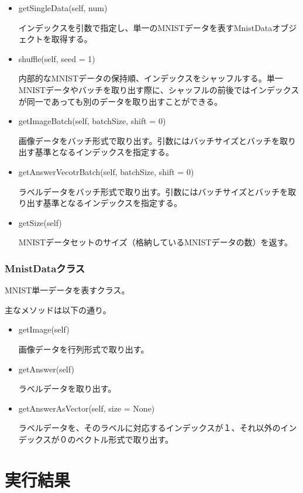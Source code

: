\documentclass{ujarticle} %
\begin{document}
\begin{itemize}
  \item getSingleData(self, num)

  インデックスを引数で指定し、単一のMNISTデータを表すMnistDataオブジェクトを取得する。

  \item shuffle(self, seed = 1)

  内部的なMNISTデータの保持順、インデックスをシャッフルする。単一MNISTデータやバッチを取り出す際に、シャッフルの前後ではインデックスが同一であっても別のデータを取り出すことができる。

  \item getImageBatch(self, batchSize, shift = 0)

  画像データをバッチ形式で取り出す。引数にはバッチサイズとバッチを取り出す基準となるインデックスを指定する。

  \item getAnswerVecotrBatch(self, batchSize, shift = 0)

  ラベルデータをバッチ形式で取り出す。引数にはバッチサイズとバッチを取り出す基準となるインデックスを指定する。

  \item getSize(self)

  MNISTデータセットのサイズ（格納しているMNISTデータの数）を返す。
\end{itemize}

\subsubsection{MnistDataクラス}
MNIST単一データを表すクラス。

主なメソッドは以下の通り。

\begin{itemize}
  \item getImage(self)

  画像データを行列形式で取り出す。

  \item getAnswer(self)

  ラベルデータを取り出す。

  \item getAnswerAsVector(self, size = None)

  ラベルデータを、そのラベルに対応するインデックスが１、それ以外のインデックスが０のベクトル形式で取り出す。

\end{itemize}

\section{実行結果}
\end{document}
